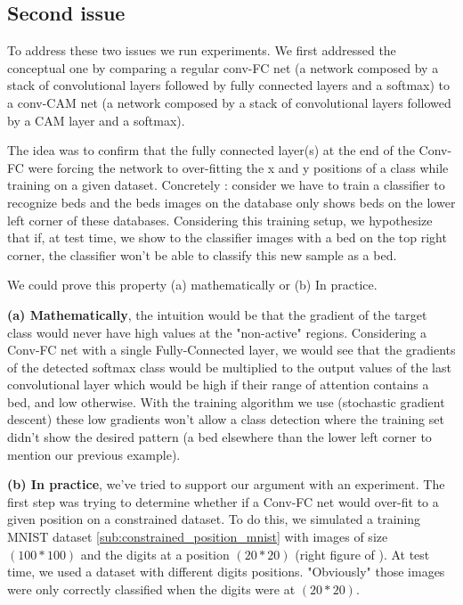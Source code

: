 		\subsection{Second issue}
		\label{sub:second_issue}		
			To address these two issues we run experiments. We first addressed the conceptual one by comparing a regular conv-FC net (a network composed by a stack of convolutional layers followed by fully connected layers and a softmax) to a conv-CAM net (a network composed by a stack of convolutional layers followed by a CAM layer and a softmax). 
			
			The idea was to confirm that the fully connected layer(s) at the end of the Conv-FC were forcing the network to over-fitting the x and y positions of a class while training on a given dataset. Concretely : consider we have to train a classifier to recognize beds and the beds images on the database only shows beds on the lower left corner of these databases. Considering this training setup, we hypothesize that if, at test time, we show to the classifier images with a bed on the top right corner, the classifier won't be able to classify this new sample as a bed.

			We could prove this property (a) mathematically or (b) In practice.

			\textbf{(a) Mathematically}, the intuition would be that the gradient of the target class would never have high values at the "non-active" regions. Considering a Conv-FC net with a single Fully-Connected layer, we would see that the gradients of the detected softmax class would be multiplied to the output values of the last convolutional layer which would be high if their range of attention contains a bed, and low otherwise. With the training algorithm we use (stochastic gradient descent) these low gradients won't allow a class detection where the training set didn't show the desired pattern (a bed elsewhere than the lower left corner to mention our previous example).

			\textbf{(b) In practice}, we've tried to support our argument with an experiment. The first step was trying to determine whether if a Conv-FC net would over-fit to a given position on a constrained dataset. To do this, we simulated a training MNIST dataset \ref{sub:constrained_position_mnist} with images of size $(100*100)$ and the digits at a position $(20*20)$ (right figure of ). At test time, we used a dataset with different digits positions. "Obviously" those images were only correctly classified when the digits were at $(20*20)$. 

